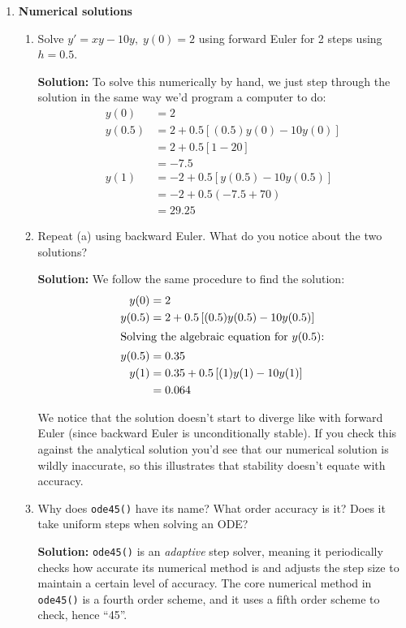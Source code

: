 \documentclass[letterpaper, fontsize=12pt]{scrartcl} %
\numberwithin{equation}{section} %
\numberwithin{figure}{section} %
\numberwithin{table}{section} %
\begin{document}
\begin{enumerate}
\begin{enumerate}[label = (\alph*)]
%


\end{enumerate}

\item \textbf{Numerical solutions}
\begin{enumerate}[label = (\alph*)]
\item Solve $y' = xy - 10y, \; y(0) = 2$ using forward Euler for 2 steps using $ h = 0.5$. 
\par \textbf{Solution:} To solve this numerically by hand, we just step through the solution in the same way we'd program a computer to do:
\begin{align*}
y(0) &= 2 \\
y(0.5) &= 2 + 0.5\left[(0.5)y(0) - 10y(0) \right] \\
&= 2 + 0.5 [1 - 20]\\
&= -7.5 \\
y(1) &= -2 + 0.5\left[y(0.5) - 10y(0.5) \right] \\
&= -2 + 0.5(-7.5 +70) \\
&= 29.25
\end{align*}

\item Repeat (a) using backward Euler. What do you notice about the two solutions?
\par \textbf{Solution:} We follow the same procedure to find the solution:
\begin{align*}
y(0) &= 2 \\
y(0.5) &= 2 + 0.5\left[ (0.5)y(0.5) - 10y(0.5) \right] \\
\intertext{Solving the algebraic equation for $y(0.5)$:}
y(0.5) &= 0.35 \\
y(1) &= 0.35 + 0.5\left[ (1)y(1) - 10y(1) \right] \\
&= 0.064
\end{align*}

We notice that the solution doesn't start to diverge like with forward Euler (since backward Euler is unconditionally stable). If you check this against the analytical solution you'd see that our numerical solution is wildly inaccurate, so this illustrates that stability doesn't equate with accuracy.

\item Why does \texttt{ode45()} have its name? What order accuracy is it? Does it take uniform steps when solving an ODE? 

\par \textbf{Solution:} \texttt{ode45()} is an \textit{adaptive} step solver, meaning it periodically checks how accurate its numerical method is and adjusts the step size to maintain a certain level of accuracy. The core numerical method in \texttt{ode45()} is a fourth order scheme, and it uses a fifth order scheme to check, hence ``45''.


\end{enumerate}
\end{enumerate}
\end{document}
